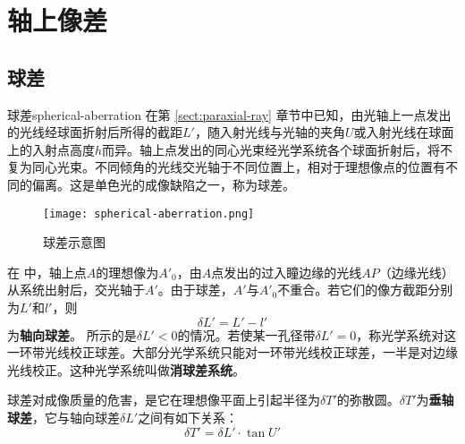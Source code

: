 \documentclass[cn,10pt,chinesefont=founder,math=newtx,cite=super,twoside]{elegantbook}
\begin{document}
\section{轴上像差}
\subsection{球差}
\begin{definition}{球差}{spherical-aberration}
在第 \ref{sect:paraxial-ray} 章节中已知，由光轴上一点发出的光线经球面折射后所得的截距$L'$，随入射光线与光轴的夹角$U$或入射光线在球面上的入射点高度$h$而异。轴上点发出的同心光束经光学系统各个球面折射后，将不复为同心光束。不同倾角的光线交光轴于不同位置上，相对于理想像点的位置有不同的偏离。这是单色光的成像缺陷之一，称为球差。
\end{definition}

\begin{figure}[htbp]
	\centering
	\texttt{[image: spherical-aberration.png]}
	\caption{球差示意图}
	\label{fig:spherical-aberration}
\end{figure}

在 中，轴上点$A$的理想像为$A'_0$，由$A$点发出的过入瞳边缘的光线$AP$（边缘光线）从系统出射后，交光轴于$A'$。由于球差，$A'$与$A'_0$不重合。若它们的像方截距分别为$L'$和$l'$，则
\begin{equation}
\delta L'=L'-l'
\label{eq:spherical-aberration}
\end{equation}
为\textbf{轴向球差}。 所示的是$\delta L'<0$的情况。若使某一孔径带$\delta L'=0$，称光学系统对这一环带光线校正球差。大部分光学系统只能对一环带光线校正球差，一半是对边缘光线校正。这种光学系统叫做\textbf{消球差系统}。

球差对成像质量的危害，是它在理想像平面上引起半径为$\delta T'$的弥散圆。$\delta T'$为\textbf{垂轴球差}，它与轴向球差$\delta L'$之间有如下关系：
\begin{equation}
\delta T'=\delta L'\cdot\tan U'
\label{eq:spherical-aberration-relationship}
\end{equation}
\end{document}
